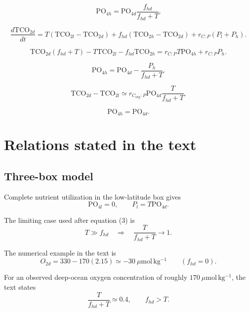 \documentclass[11pt]{article}
\newcommand{\TCO}[1]{\mathrm{TCO}_{2#1}}
\newcommand{\PO}[1]{\mathrm{PO}_{4#1}}
\begin{document}
\begin{equation}
\PO{h}
=
\PO{d}\frac{f_{hd}}{f_{hd}+T}.
\tag{9}
\end{equation}

\begin{equation}
\frac{d\TCO{d}}{dt}
=
T\left(\TCO{l}-\TCO{d}\right)
+f_{hd}\left(\TCO{h}-\TCO{d}\right)
+r_{C:P}\left(P_l+P_h\right).
\tag{10}
\end{equation}

\begin{equation}
\TCO{d}\left(f_{hd}+T\right)
-T\TCO{l}
-f_{hd}\TCO{h}
=
r_{C:P}T\PO{h}+r_{C:P}P_h.
\tag{11}
\end{equation}

\begin{equation}
\PO{h}
=
\PO{d}-
\frac{P_h}{f_{hd}+T}.
\tag{12}
\end{equation}

\begin{equation}
\TCO{d}-\TCO{l}
\simeq
r_{C_{\mathrm{org}}:P}\PO{d}\frac{T}{f_{hd}+T}.
\tag{13}
\end{equation}

\begin{equation}
\PO{h}=\PO{d}.
\tag{14}
\end{equation}

\section*{Relations stated in the text}

\subsection*{Three-box model}

Complete nutrient utilization in the low-latitude box gives
\begin{equation*}
\PO{l}=0,
\qquad
P_l=T\PO{d}.
\end{equation*}

The limiting case used after equation (3) is
\begin{equation*}
T\gg f_{hd}
\quad\Longrightarrow\quad
\frac{T}{f_{hd}+T}\to 1.
\end{equation*}

The numerical example in the text is
\begin{equation*}
O_{2d}
=330-170(2.15)
\simeq -30\ \mu\mathrm{mol\,kg^{-1}}
\qquad (f_{hd}=0).
\end{equation*}

For an observed deep-ocean oxygen concentration of roughly
$170\ \mu\mathrm{mol\,kg^{-1}}$, the text states
\begin{equation*}
\frac{T}{f_{hd}+T}\simeq 0.4,
\qquad
f_{hd}>T.
\end{equation*}
\end{document}
